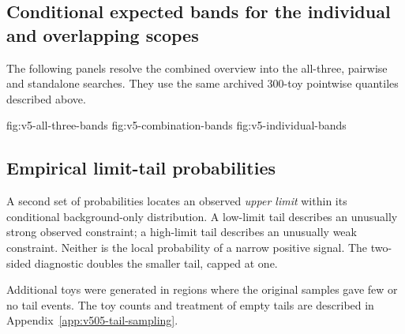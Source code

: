 \subsection{Conditional expected bands for the individual and overlapping scopes}
The following panels resolve the combined overview into the all-three,
pairwise and standalone searches. They use the same archived 300-toy
pointwise quantiles described above.

{fig:v5-all-three-bands}
{fig:v5-combination-bands}
{fig:v5-individual-bands}
\FloatBarrier

\subsection{Empirical limit-tail probabilities}
\label{sec:v5-tail-results}

A second set of probabilities locates an observed \emph{upper limit} within its
conditional background-only distribution. A low-limit tail describes an
unusually strong observed constraint; a high-limit tail describes an unusually
weak constraint. Neither is the local probability of a narrow positive signal.
The two-sided diagnostic doubles the smaller tail, capped at one.

Additional toys were generated in regions where the original samples gave
few or no tail events. The toy counts and treatment of empty tails are
described in Appendix~\ref{app:v505-tail-sampling}.

